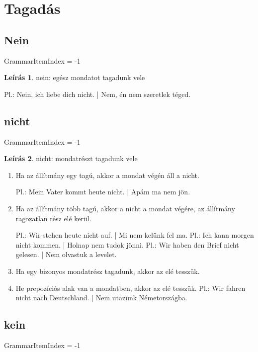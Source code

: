 \documentclass{article}
\theoremstyle{definition}
\newtheorem*{desc}{Leírás}
\begin{document}
\section{Tagadás}

\subsection{Nein}

GrammarItemIndex = -1

\begin{desc}
nein: egész mondatot tagadunk vele

Pl.: Nein, ich liebe dich nicht. | Nem, én nem szeretlek téged.
\end{desc}

\subsection{nicht}

GrammarItemIndex = -1

\begin{desc}
nicht: mondatrészt tagadunk vele

\begin{enumerate}
\item Ha az állítmány egy tagú, akkor a mondat végén áll a nicht.

Pl.: Mein Vater kommt heute nicht. | Apám ma nem jön.

\item Ha az állítmány több tagú, akkor a nicht a mondat végére, az állítmány ragozatlan rész elé kerül.

Pl.: Wir stehen heute nicht auf. | Mi nem kelünk fel ma.
Pl.: Ich kann morgen nicht kommen. | Holnap nem tudok jönni.
Pl.: Wir haben den Brief nicht gelesen. | Nem olvastuk a levelet.

\item Ha egy bizonyos mondatrész tagadunk, akkor az elé tesszük.
\item He prepozíciós alak van a mondatben, akkor az elé tesszük.
Pl.: Wir fahren nicht nach Deutschland. | Nem utazunk Németországba.
\end{enumerate}
\end{desc}

\subsection{kein}

GrammarItemIndex = -1
\end{document}

